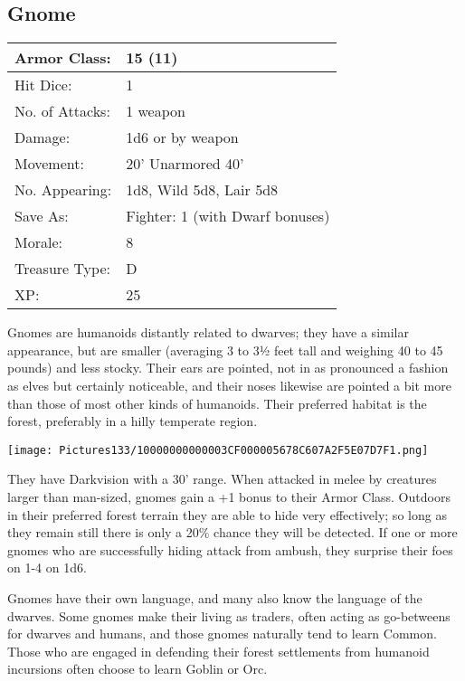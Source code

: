 \documentclass[a4paper,twoside,openany,10pt]{book}
\begin{document}
\begin{multicols}{2}
\subsection*{Gnome}\label{gnome}

\begin{tabularx}{0.48\textwidth}{@{}lX@{}}
Armor Class: & 15 (11) \\\hline
Hit Dice: & 1 \\\hline
No. of Attacks: & 1 weapon \\\hline
Damage: & 1d6 or by weapon \\\hline
Movement: & 20' Unarmored 40' \\\hline
No. Appearing: & 1d8, Wild 5d8, Lair 5d8 \\\hline
Save As: & Fighter: 1 (with Dwarf bonuses) \\\hline
Morale: & 8 \\\hline
Treasure Type: & D \\\hline
XP: & 25 \\\hline
\end{tabularx}\medskip

Gnomes are humanoids distantly related to dwarves; they have a similar appearance, but are smaller (averaging 3 to 3½ feet tall and weighing 40 to 45 pounds) and less stocky. Their ears are pointed, not in as pronounced a fashion as elves but certainly noticeable, and their noses likewise are pointed a bit more than those of most other kinds of humanoids. Their preferred habitat is the forest, preferably in a hilly temperate region.


\begin{center}
	\texttt{[image: Pictures133/10000000000003CF000005678C607A2F5E07D7F1.png]}
\end{center}

They have Darkvision with a 30' range. When attacked in melee by creatures larger than man-sized, gnomes gain a +1 bonus to their Armor Class. Outdoors in their preferred forest terrain they are able to hide very effectively; so long as they remain still there is only a 20\% chance they will be detected. If one or more gnomes who are successfully hiding attack from ambush, they surprise their foes on 1-4 on 1d6.

Gnomes have their own language, and many also know the language of the dwarves. Some gnomes make their living as traders, often acting as go-betweens for dwarves and humans, and those gnomes naturally tend to learn Common. Those who are engaged in defending their forest settlements from humanoid incursions often choose to learn Goblin or Orc.


\end{multicols}
\end{document}
